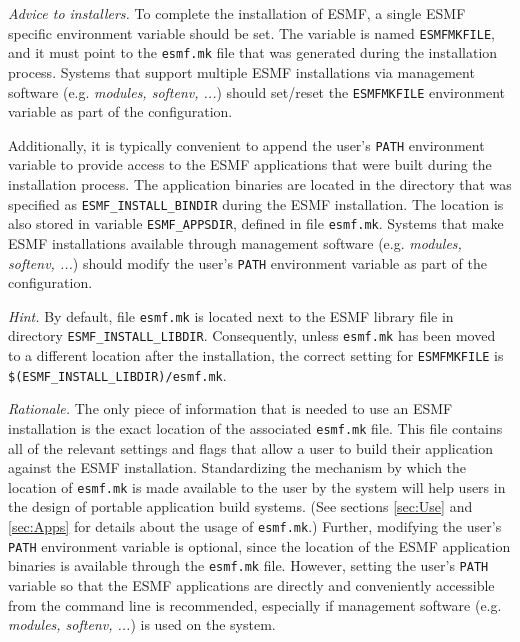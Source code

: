 {\em Advice to installers.} To complete the installation of ESMF, a single ESMF specific environment variable should be set. The variable is named {\tt ESMFMKFILE}, and it must point to the {\tt esmf.mk} file that was generated during the installation process. Systems that support multiple ESMF installations via management software (e.g. {\em modules, softenv, ...}) should set/reset the {\tt ESMFMKFILE} environment variable as part of the configuration.

Additionally, it is typically convenient to append the user's {\tt PATH} environment variable to provide access to the ESMF applications that were built during the installation process. The application binaries are located in the directory that was specified as {\tt ESMF\_INSTALL\_BINDIR} during the ESMF installation. The location is also stored in variable {\tt ESMF\_APPSDIR}, defined in file {\tt esmf.mk}. Systems that make ESMF installations available through management software (e.g. {\em modules, softenv, ...}) should modify the user's {\tt PATH} environment variable as part of the configuration.

{\em Hint.} By default, file {\tt esmf.mk} is located next to the ESMF library file in  directory {\tt ESMF\_INSTALL\_LIBDIR}. Consequently, unless {\tt esmf.mk} has been moved to a different location after the installation, the correct setting for {\tt ESMFMKFILE} is {\tt \$(ESMF\_INSTALL\_LIBDIR)/esmf.mk}.

{\em Rationale.} The only piece of information that is needed to use an ESMF installation is the exact location of the associated {\tt esmf.mk} file. This file contains all of the relevant settings and flags that allow a user to build their application against the ESMF installation. Standardizing the mechanism by which the location of {\tt esmf.mk} is made available to the user by the system will help users in the design of portable application build systems. (See sections \ref{sec:Use} and \ref{sec:Apps} for details about the usage of {\tt esmf.mk}.) Further, modifying the user's {\tt PATH} environment variable is optional, since the location of the ESMF application binaries is available through the {\tt esmf.mk} file. However, setting the user's {\tt PATH} variable so that the ESMF applications are directly and conveniently accessible from the command line is recommended, especially if management software (e.g. {\em modules, softenv, ...}) is used on the system.

